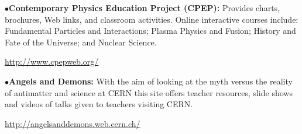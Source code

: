 \item{$\bullet$}{\bf Contemporary Physics Education Project (CPEP):}
Provides charts, brochures, Web links, and classroom activities. Online interactive courses include: Fundamental Particles and Interactions; Plasma Physics and Fusion; History and Fate of the Universe; and Nuclear Science.
	\item{}\qquad\url{http://www.cpepweb.org/}




%






\medskip
\medskip
\newpage
{}

\medskip

\item{$\bullet$}{\bf Angels and Demons:}
With the aim of looking at the myth versus the reality of antimatter and science at CERN this site offers teacher resources, slide shows and videos of talks given to teachers visiting CERN.
	\item{}\qquad\url{http://angelsanddemons.web.cern.ch/}

